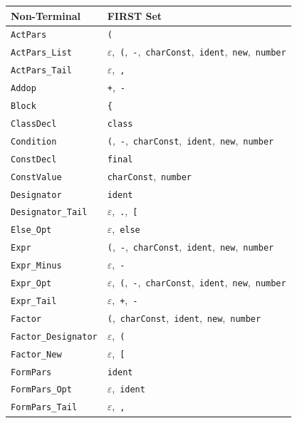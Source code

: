 \documentclass[11pt,a4paper]{article}
\newcommand{\theadcell}[1]{\textbf{\color{white}#1}}
\begin{document}
\begin{center}
\begin{tabular}{|L{3.8cm}|L{10.6cm}|}
\hline
{}
\theadcell{Non-Terminal} & \theadcell{FIRST Set} \\
\hline
\texttt{ActPars} & \texttt{(} \\
\texttt{ActPars\_List} & $\varepsilon$,\ \texttt{(},\ \texttt{-},\ \texttt{charConst},\ \texttt{ident},\ \texttt{new},\ \texttt{number} \\
\texttt{ActPars\_Tail} & $\varepsilon$,\ \texttt{,} \\
\texttt{Addop} & \texttt{+},\ \texttt{-} \\
\texttt{Block} & \texttt{\{} \\
\texttt{ClassDecl} & \texttt{class} \\
\texttt{Condition} & \texttt{(},\ \texttt{-},\ \texttt{charConst},\ \texttt{ident},\ \texttt{new},\ \texttt{number} \\
\texttt{ConstDecl} & \texttt{final} \\
\texttt{ConstValue} & \texttt{charConst},\ \texttt{number} \\
\texttt{Designator} & \texttt{ident} \\
\texttt{Designator\_Tail} & $\varepsilon$,\ \texttt{.},\ \texttt{[} \\
\texttt{Else\_Opt} & $\varepsilon$,\ \texttt{else} \\
\texttt{Expr} & \texttt{(},\ \texttt{-},\ \texttt{charConst},\ \texttt{ident},\ \texttt{new},\ \texttt{number} \\
\texttt{Expr\_Minus} & $\varepsilon$,\ \texttt{-} \\
\texttt{Expr\_Opt} & $\varepsilon$,\ \texttt{(},\ \texttt{-},\ \texttt{charConst},\ \texttt{ident},\ \texttt{new},\ \texttt{number} \\
\texttt{Expr\_Tail} & $\varepsilon$,\ \texttt{+},\ \texttt{-} \\
\texttt{Factor} & \texttt{(},\ \texttt{charConst},\ \texttt{ident},\ \texttt{new},\ \texttt{number} \\
\texttt{Factor\_Designator} & $\varepsilon$,\ \texttt{(} \\
\texttt{Factor\_New} & $\varepsilon$,\ \texttt{[} \\
\texttt{FormPars} & \texttt{ident} \\
\texttt{FormPars\_Opt} & $\varepsilon$,\ \texttt{ident} \\
\texttt{FormPars\_Tail} & $\varepsilon$,\ \texttt{,} \\

\end{tabular}
\end{center}
\end{document}
